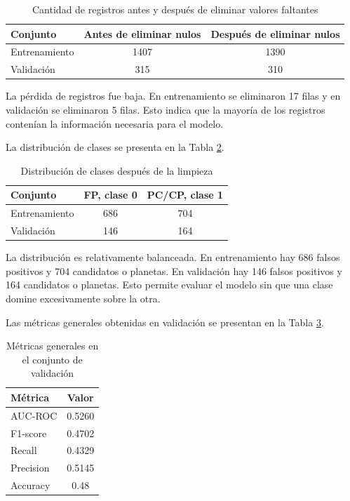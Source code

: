 \documentclass[12pt,letterpaper]{article}
\begin{document}
\begin{table}[H]
\centering
\caption{Cantidad de registros antes y después de eliminar valores faltantes}
\label{tab:filas}
\begin{tabular}{lcc}
\toprule
\textbf{Conjunto} & \textbf{Antes de eliminar nulos} & \textbf{Después de eliminar nulos} \\
\midrule
Entrenamiento & 1407 & 1390 \\
Validación & 315 & 310 \\
\bottomrule
\end{tabular}
\end{table}

La pérdida de registros fue baja. En entrenamiento se eliminaron 17 filas y en validación se eliminaron 5 filas. Esto indica que la mayoría de los registros contenían la información necesaria para el modelo.

La distribución de clases se presenta en la Tabla \ref{tab:clases}.

\begin{table}[H]
\centering
\caption{Distribución de clases después de la limpieza}
\label{tab:clases}
\begin{tabular}{lcc}
\toprule
\textbf{Conjunto} & \textbf{FP, clase 0} & \textbf{PC/CP, clase 1} \\
\midrule
Entrenamiento & 686 & 704 \\
Validación & 146 & 164 \\
\bottomrule
\end{tabular}
\end{table}

La distribución es relativamente balanceada. En entrenamiento hay 686 falsos positivos y 704 candidatos o planetas. En validación hay 146 falsos positivos y 164 candidatos o planetas. Esto permite evaluar el modelo sin que una clase domine excesivamente sobre la otra.

Las métricas generales obtenidas en validación se presentan en la Tabla \ref{tab:metricas}.

\begin{table}[H]
\centering
\caption{Métricas generales en el conjunto de validación}
\label{tab:metricas}
\begin{tabular}{lc}
\toprule
\textbf{Métrica} & \textbf{Valor} \\
\midrule
AUC-ROC & 0.5260 \\
F1-score & 0.4702 \\
Recall & 0.4329 \\
Precision & 0.5145 \\
Accuracy & 0.48 \\
\bottomrule
\end{tabular}
\end{table}
\end{document}
